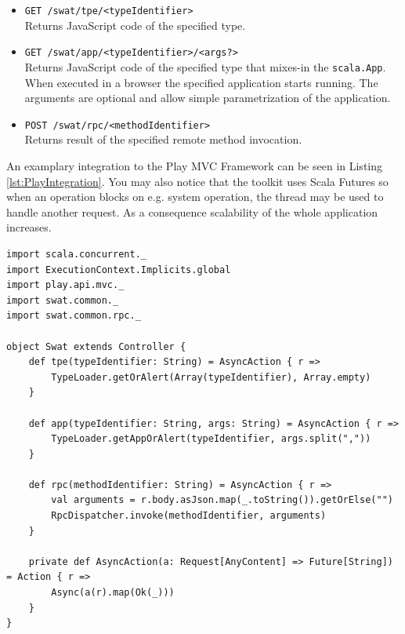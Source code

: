 \documentclass[12pt,a4paper]{report}
\begin{document}
\begin{itemize}
\item \texttt{GET /swat/tpe/<typeIdentifier>}\\
Returns JavaScript code of the specified type.
\item \texttt{GET /swat/app/<typeIdentifier>/<args?>}\\
Returns JavaScript code of the specified type that mixes-in the \texttt{scala.App}. When executed in a browser the specified application starts running. The arguments are optional and allow simple parametrization of the application.
\item \texttt{POST /swat/rpc/<methodIdentifier>}\\
Returns result of the specified remote method invocation.  
\end{itemize}

An examplary integration to the Play MVC Framework \cite{Play} can be seen in Listing \ref{lst:PlayIntegration}. You may also notice that the toolkit uses Scala Futures \cite{ScalaFutures} so when an operation blocks on e.g. system operation, the thread may be used to handle another request. As a consequence scalability of the whole application increases.

\begin{minipage}{\linewidth}
\begin{lstlisting}[caption={Integration of Swat toolkit to Play Framework.},label={lst:PlayIntegration},basicstyle=\scriptsize\ttfamily]
import scala.concurrent._
import ExecutionContext.Implicits.global
import play.api.mvc._
import swat.common._
import swat.common.rpc._

object Swat extends Controller {
    def tpe(typeIdentifier: String) = AsyncAction { r =>
        TypeLoader.getOrAlert(Array(typeIdentifier), Array.empty)
    }

    def app(typeIdentifier: String, args: String) = AsyncAction { r =>
        TypeLoader.getAppOrAlert(typeIdentifier, args.split(","))
    }

    def rpc(methodIdentifier: String) = AsyncAction { r =>
        val arguments = r.body.asJson.map(_.toString()).getOrElse("")
        RpcDispatcher.invoke(methodIdentifier, arguments)
    }

    private def AsyncAction(a: Request[AnyContent] => Future[String]) = Action { r =>
        Async(a(r).map(Ok(_)))
    }
}
\end{lstlisting}
\end{minipage}
\end{document}
